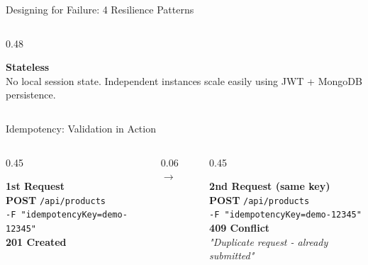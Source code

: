 \begin{frame}{Designing for Failure: 4 Resilience Patterns}
\begin{columns}[T]
        \begin{column}{0.48\textwidth}
            \begin{tcolorbox}[enhanced, colback=white, colframe=teal!70!black, arc=4pt, boxrule=1pt, drop fuzzy shadow]
                \textbf{\textcolor{teal!70!black}{\large Stateless}}\\[4pt]
                \scriptsize No local session state. Independent instances scale easily using JWT + MongoDB persistence.
            \end{tcolorbox}
        \end{column}
    \end{columns}
\end{frame}


\begin{frame}{Idempotency: Validation in Action}
    \vspace{0.4cm}
    
    \begin{columns}[c]
        
        \begin{column}{0.45\textwidth}
            \begin{tcolorbox}[colback=white, colframe=gray!30, arc=2pt, boxrule=0.5pt]
                \textbf{\textcolor{green!60!black}{1st Request}}\\[0.2cm]
                \scriptsize
                \textcolor{blue!70!black}{\textbf{POST}} \texttt{/api/products} \\
                \textcolor{gray!80!black}{\texttt{-F "idempotencyKey=demo-12345"}} \\[0.4cm]
                \textcolor{green!60!black}{\large \textbf{201 Created}}
            \end{tcolorbox}
        \end{column}
    
        \begin{column}{0.06\textwidth}
            \centering
            \textcolor{gray!60}{\Large $\rightarrow$}
        \end{column}
        
        \begin{column}{0.45\textwidth}
            \begin{tcolorbox}[colback=white, colframe=gray!30, arc=2pt, boxrule=0.5pt]
                \textbf{\textcolor{red!70!black}{2nd Request} \small(same key)}\\[0.2cm]
                \scriptsize
                \textcolor{blue!70!black}{\textbf{POST}} \texttt{/api/products} \\
                \textcolor{gray!80!black}{\texttt{-F "idempotencyKey=demo-12345"}} \\[0.2cm]
                \textcolor{red!70!black}{\large \textbf{409 Conflict}} \\
                \textit{\tiny "Duplicate request - already submitted"}
            \end{tcolorbox}
        \end{column}
        

\end{columns}
\end{frame}
